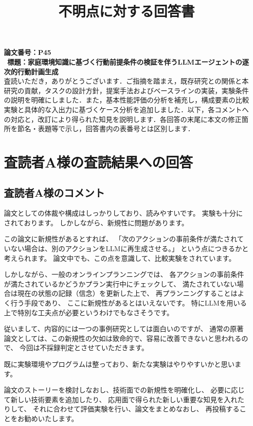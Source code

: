\documentclass{jsarticle}
\title{不明点に対する回答書}
\author{\empty}
\date{\empty}
\begin{document}
\maketitle
\noindent \textbf{論文番号：P45} \\\
\noindent \textbf{標題：家庭環境知識に基づく行動前提条件の検証を伴うLLMエージェントの逐次的行動計画生成}  \\

査読いただき，ありがとうございます．ご指摘を踏まえ，既存研究との関係と本研究の貢献，タスクの設計方針，提案手法およびベースラインの実装，実験条件の説明を明確にしました．また，基本性能評価の分析を補充し，構成要素の比較実験と具体的な入出力に基づくケース分析を追加しました．以下，各コメントへの対応と，改訂により得られた知見を説明します．各回答の末尾に本文の修正箇所を節名・表題等で示し，回答書内の表番号とは区別します．



\newpage

\section*{査読者A様の査読結果への回答}

\subsection*{査読者A様のコメント}
\begin{screen}
論文としての体裁や構成はしっかりしており、読みやすいです。
実験も十分にされております。
しかしながら、新規性に問題があります。

この論文に新規性があるとすれば、
「次のアクションの事前条件が満たされていない場合は、別のアクションをLLMに再生成させる。」
という点につきるかと考えられます。
論文中でも、この点を意識して、比較実験をされています。

しかしながら、一般のオンラインプランニングでは、
各アクションの事前条件が満たされているかどうかプラン実行中にチェックして、
満たされていない場合は現在の状態の記録（信念）を更新した上で、
再プランニングすることはよく行う手段であり、
ここに新規性があるとはいえないです。
特にLLMを用いる上で特別な工夫点が必要というわけでもなさそうです。

従いまして、内容的には一つの事例研究としては面白いのですが、
通常の原著論文としては、この新規性の欠如は致命的で、容易に改善できないと思われるので、
今回は不採録判定とさせていただきます。

既に実験環境やプログラムは整っており、新たな実験はやりやすいかと思います。

論文のストーリーを検討しなおし、技術面での新規性を明確化し、
必要に応じて新しい技術要素を追加したり、
応用面で得られた新しい重要な知見を入れたりして、
それに合わせて評価実験を行い、論文をまとめなおし、
再投稿することをお勧めいたします。
\end{screen}
\end{document}
